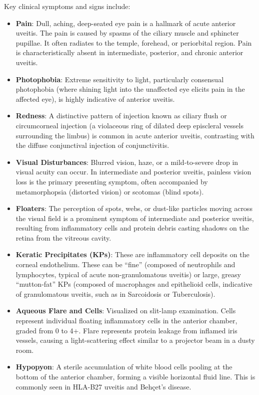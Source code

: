 Key clinical symptoms and signs include:
\begin{itemize}
    \item \textbf{Pain}: Dull, aching, deep-seated eye pain is a hallmark of acute anterior uveitis. The pain is caused by spasms of the ciliary muscle and sphincter pupillae. It often radiates to the temple, forehead, or periorbital region. Pain is characteristically absent in intermediate, posterior, and chronic anterior uveitis.
    \item \textbf{Photophobia}: Extreme sensitivity to light, particularly consensual photophobia (where shining light into the unaffected eye elicits pain in the affected eye), is highly indicative of anterior uveitis.
    \item \textbf{Redness}: A distinctive pattern of injection known as ciliary flush or circumcorneal injection (a violaceous ring of dilated deep episcleral vessels surrounding the limbus) is common in acute anterior uveitis, contrasting with the diffuse conjunctival injection of conjunctivitis.
    \item \textbf{Visual Disturbances}: Blurred vision, haze, or a mild-to-severe drop in visual acuity can occur. In intermediate and posterior uveitis, painless vision loss is the primary presenting symptom, often accompanied by metamorphopsia (distorted vision) or scotomas (blind spots).
    \item \textbf{Floaters}: The perception of spots, webs, or dust-like particles moving across the visual field is a prominent symptom of intermediate and posterior uveitis, resulting from inflammatory cells and protein debris casting shadows on the retina from the vitreous cavity.
    \item \textbf{Keratic Precipitates (KPs)}: These are inflammatory cell deposits on the corneal endothelium. These can be ``fine'' (composed of neutrophils and lymphocytes, typical of acute non-granulomatous uveitis) or large, greasy ``mutton-fat'' KPs (composed of macrophages and epithelioid cells, indicative of granulomatous uveitis, such as in Sarcoidosis or Tuberculosis).
    \item \textbf{Aqueous Flare and Cells}: Visualized on slit-lamp examination. Cells represent individual floating inflammatory cells in the anterior chamber, graded from 0 to 4+. Flare represents protein leakage from inflamed iris vessels, causing a light-scattering effect similar to a projector beam in a dusty room.
    \item \textbf{Hypopyon}: A sterile accumulation of white blood cells pooling at the bottom of the anterior chamber, forming a visible horizontal fluid line. This is commonly seen in HLA-B27 uveitis and Beh\c{c}et's disease.

\end{itemize}
